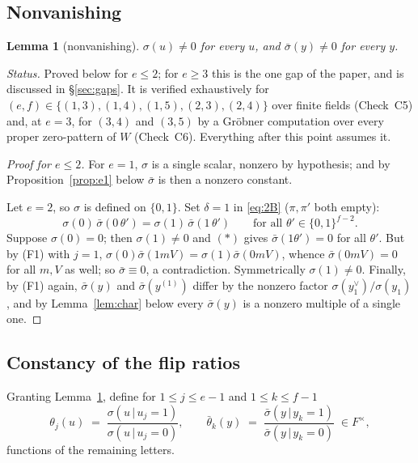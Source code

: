 \documentclass[11pt]{article}
\newtheorem{lemma}[theorem]{Lemma}
\theoremstyle{definition}
\theoremstyle{remark}
\begin{document}
\subsection{Nonvanishing}

\begin{lemma}[nonvanishing]\label{lem:nonvanish}
$\sigma(u)\ne0$ for every $u$, and $\bar\sigma(y)\ne0$ for every $y$.
\end{lemma}

\noindent\emph{Status.}  Proved below for $e\le2$; for $e\ge3$ this is the one gap of the
paper, and is discussed in \S\ref{sec:gaps}.  It is verified exhaustively for
$(e,f)\in\{(1,3),(1,4),(1,5),(2,3),(2,4)\}$ over finite fields (Check~C5) and, at $e=3$,
for $(3,4)$ and $(3,5)$ by a Gr\"obner computation over every proper zero-pattern of $W$
(Check~C6).  Everything after this point assumes it.

\begin{proof}[Proof for $e\le2$]
For $e=1$, $\sigma$ is a single scalar, nonzero by hypothesis; and by
Proposition~\ref{prop:e1} below $\bar\sigma$ is then a nonzero constant.

Let $e=2$, so $\sigma$ is defined on $\{0,1\}$.  Set $\delta=1$ in \eqref{eq:2B}
($\pi,\pi'$ both empty):
\[
   \sigma(0)\,\bar\sigma(0\,\theta')=\sigma(1)\,\bar\sigma(1\,\theta')
   \qquad\text{for all }\theta'\in\{0,1\}^{f-2}. \tag{$*$}
\]
Suppose $\sigma(0)=0$; then $\sigma(1)\ne0$ and $(*)$ gives $\bar\sigma(1\theta')=0$ for
all $\theta'$.  But by (F1) with $j=1$, $\sigma(0)\bar\sigma(1mV)=\sigma(1)\bar\sigma(0mV)$,
whence $\bar\sigma(0mV)=0$ for all $m,V$ as well; so $\bar\sigma\equiv0$, a contradiction.
Symmetrically $\sigma(1)\ne0$.  Finally, by (F1) again, $\bar\sigma(y)$ and
$\bar\sigma(y^{(1)})$ differ by the nonzero factor $\sigma(y_1^{\vee})/\sigma(y_1)$, and by
Lemma~\ref{lem:char} below every $\bar\sigma(y)$ is a nonzero multiple of a single one.
\end{proof}

\subsection{Constancy of the flip ratios}

Granting Lemma~\ref{lem:nonvanish}, define for $1\le j\le e-1$ and $1\le k\le f-1$
\[
   \theta_j(u)\;=\;\frac{\sigma(u\,|\,u_j=1)}{\sigma(u\,|\,u_j=0)},\qquad
   \bar\theta_k(y)\;=\;\frac{\bar\sigma(y\,|\,y_k=1)}{\bar\sigma(y\,|\,y_k=0)}\;\in F^{\times},
\]
functions of the remaining letters.
\end{document}
